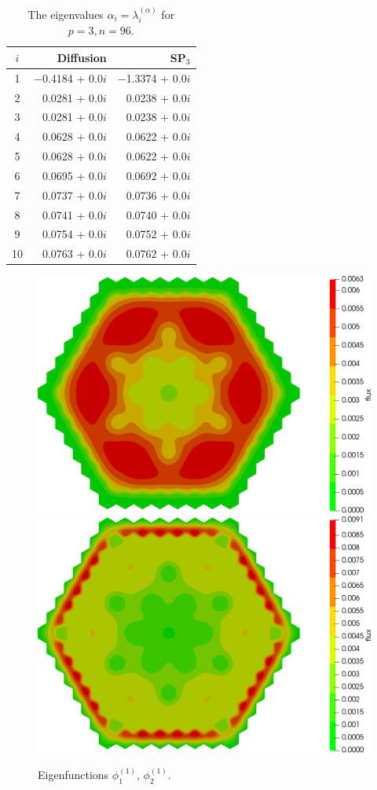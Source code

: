 \documentclass[authoryear]{elsarticle}
\begin{document}
\begin{table}[h]
\caption{The eigenvalues $\alpha_i=\lambda_i^{(\alpha)}$ for $p=3, n=96$.}
\label{tab:iaea_with_alpha_del_10}
\begin{center}
\begin{tabular}{c r r}
\hline
$i$ & Diffusion & SP$_3$ \\
\hline
1& $-$0.4184 + 0.0$i$&$-$1.3374 + 0.0$i$\\
2& 0.0281 + 0.0$i$&0.0238 + 0.0$i$\\
3& 0.0281 + 0.0$i$&0.0238 + 0.0$i$\\
4& 0.0628 + 0.0$i$&0.0622 + 0.0$i$\\
5& 0.0628 + 0.0$i$&0.0622 + 0.0$i$\\
6& 0.0695 + 0.0$i$&0.0692 + 0.0$i$\\
7& 0.0737 + 0.0$i$&0.0736 + 0.0$i$\\
8& 0.0741 + 0.0$i$&0.0740 + 0.0$i$\\
9& 0.0754 + 0.0$i$&0.0752 + 0.0$i$\\
10& 0.0763 + 0.0$i$&0.0762 + 0.0$i$\\
\hline
\end{tabular}
\end{center}
\end{table}

\begin{figure}[h]
\begin{center}
	\includegraphics[width=0.49\linewidth]{iaea_with/alpha_delayed_sp3_u1_1.png}
	\includegraphics[width=0.49\linewidth]{iaea_with/alpha_delayed_sp3_u2_1.png}\\
	\caption{Eigenfunctions $\phi_1^{(1)}$, $\phi_2^{(1)}$.}
	\label{fig:iaea_with_fun_del_1}
\end{center}
\end{figure}
\end{document}
